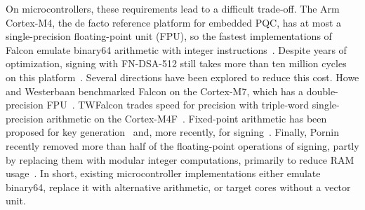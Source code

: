 On microcontrollers, these requirements lead to a difficult trade-off.
The Arm Cortex-M4, the de facto reference platform for embedded PQC, has at
most a single-precision floating-point unit (FPU), so the fastest
implementations of Falcon emulate binary64 arithmetic with integer
instructions~\cite{Pornin19,Pornin25m4}.
Despite years of optimization, signing with FN-DSA-512 still takes more than
ten million cycles on this platform~\cite{Pornin25m4,Pornin26ram}.
Several directions have been explored to reduce this cost.
Howe and Westerbaan benchmarked Falcon on the Cortex-M7, which has a
double-precision FPU~\cite{HW23}.
TWFalcon trades speed for precision with triple-word single-precision
arithmetic on the Cortex-M4F~\cite{TWFalcon}.
Fixed-point arithmetic has been proposed for key
generation~\cite{Pornin23kg,Pornin25kg} and, more recently, for
signing~\cite{BFLP26}.
Finally, Pornin recently removed more than half of the floating-point
operations of signing, partly by replacing them with modular integer
computations, primarily to reduce RAM usage~\cite{Pornin26ram}.
In short, existing microcontroller implementations either emulate binary64,
replace it with alternative arithmetic, or target cores without a vector
unit.

